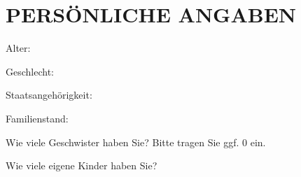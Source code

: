 
\section{\uppercase{Persönliche Angaben}}
\vspace{.25cm}

\begin{choicequestion}[6]{Alter:}
\end{choicequestion}

\separate

\begin{choicequestion}[1]{Geschlecht:}
\end{choicequestion}


\separate

\begin{choicequestion}[4]{Staatsangehörigkeit:}
	 \\
\end{choicequestion}

\separate

\begin{choicequestion}[1]{Familienstand:}
\end{choicequestion}

\separate

\begin{choicequestion}[8]{Wie viele Geschwister haben Sie? \newline \footnotesize{Bitte tragen Sie ggf. 0 ein.}}
	 \\
\end{choicequestion}

\vspace{-.1cm}

\separate

\vspace{-.1cm}

\begin{choicequestion}[6]{Wie viele eigene Kinder haben Sie?}
	 \\
\end{choicequestion}

